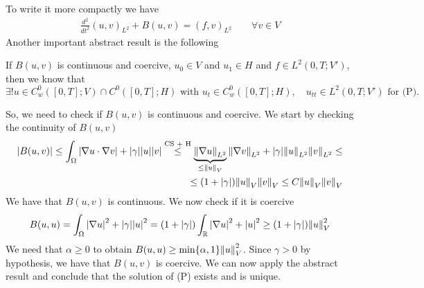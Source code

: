 To write it more compactly we have
\[
    \begin{split}
        \frac{d^2}{dt^2} (u, v)_{L^2} + B(u, v) = (f, v)_{L^2} \qquad \forall v \in V
    \end{split}
\]
Another important abstract result is the following
\begin{remark}
    If \(B(u, v)\) is continuous and coercive, \(u_0 \in V\) and \(u_1 \in H\) and \(f \in L^2(0, T; V')\), then we know that
    \[
        \exists! u \in C_w^0([0, T]; V) \cap C^0([0, T]; H) \text{ with } u_t \in C_w^0([0, T]; H), \quad u_{tt} \in L^2(0, T; V') \text{ for (P).}
    \]
\end{remark}
So, we need to check if \(B(u, v)\) is continuous and coercive. We start by checking the continuity of \(B(u, v)\)
\[
    \begin{split}
        \abs{B(u, v)} \leq \int_\Omega \abs{\nabla u \cdot \nabla v} + \abs{\gamma} \abs{u} \abs{v} \overset{\text{CS + H}}{\leq} \underbrace{\norm{\nabla u}_{L^2}}_{\leq \norm{u}_V} \norm{\nabla v}_{L^2} + \abs{\gamma} \norm{u}_{L^2} \norm{v}_{L^2} \leq \\
        \leq (1 + \abs{\gamma}) \norm{u}_V \norm{v}_V \leq C \norm{u}_V \norm{v}_V
    \end{split}
\]
We have that \(B(u, v)\) is continuous. We now check if it is coercive
\[
    \begin{split}
        B(u, u) = \int_\Omega \abs{\nabla u}^2 + \abs{\gamma} \abs{u}^2 = (1 + \abs{\gamma}) \int_{\mathbb{R}} \abs{\nabla u}^2  + \abs{u}^2 \geq (1 + \abs{\gamma}) \norm{u}_V^2
    \end{split}
\]
We need that \(\alpha \geq 0\) to obtain \(B(u,u) \geq \min\{\alpha, 1\}
\norm{u}_V^2\). Since \(\gamma > 0\) by hypothesis, we have that \(B(u, v)\) is
coercive. We can now apply the abstract result and conclude that the solution
of (P) exists and is unique.


